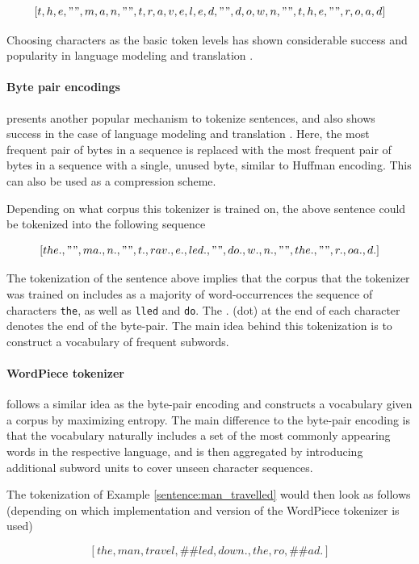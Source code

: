 \documentclass[a4paper,12pt,oneside,openright]{report}
\begin{document}
$$
[t, h, e, " ", m, a, n, " ", t, r, a, v, e, l, e, d, " ", d, o, w, n, " ", t, h, e, " ", r, o, a, d]
$$

Choosing characters as the basic token levels has shown considerable success and popularity in language modeling \cite{sutskever11} and translation \cite{lee17}.

\paragraph{Byte pair encodings} \cite{gage94} presents another popular mechanism to tokenize sentences, and also shows success in the case of language modeling and translation \cite{sennrich16}. 
Here, the most frequent pair of bytes in a sequence is replaced with the most frequent pair of bytes in a sequence with a single, unused byte, similar to Huffman encoding.
This can also be used as a compression scheme.

Depending on what corpus this tokenizer is trained on, the above sentence could be tokenized into the following sequence

$$
[the., " ", ma., n., " ", t., rav., e., led., " ", do., w., n., " ", the., " ", r., oa., d.]
$$

The tokenization of the sentence above implies that the corpus that the tokenizer was trained on includes as a majority of word-occurrences the sequence of characters \texttt{the}, as well as \texttt{lled} and \texttt{do}. 
The $.$ (dot) at the end of each character denotes the end of the byte-pair.
The main idea behind this tokenization is to construct a vocabulary of frequent subwords.

\paragraph{WordPiece tokenizer} \label{tokenizer:WordPiece} \cite{wu16} follows a similar idea as the byte-pair encoding and constructs a vocabulary given a corpus by maximizing entropy.
The main difference to the byte-pair encoding is that the vocabulary naturally includes a set of the most commonly appearing words in the respective language, and is then aggregated by introducing additional subword units to cover unseen character sequences.

The tokenization of Example \ref{sentence:man_travelled} would then look as follows (depending on which implementation and version of the WordPiece tokenizer is used)

$$
[the, man, travel, \#\#led, down., the, ro,  \#\#ad.]
$$
\end{document}
